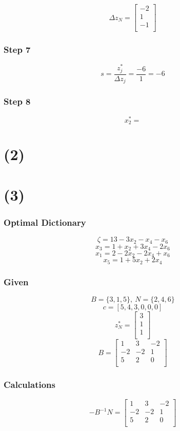 \documentclass[14pt]{extarticle}
\begin{document}
\[
    \Delta z_N =
    \begin{bmatrix}
        -2 \\
        1 \\
        -1 \\
    \end{bmatrix}
\]

\subsubsection*{Step 7}
\[
    s = \frac{z^*_j}{\Delta z_j} = \frac{-6}{1} = -6
\]

\subsubsection*{Step 8}
\[
    x^*_2 = 
\]

\section*{(2)}

\section*{(3)}
\subsubsection*{Optimal Dictionary}
\[
    \zeta = 13-3x_2-x_4-x_6
\]
\[
    x_3 = 1+x_2+3x_4-2x_6
\]
\[
    x_1 = 2-2x_2-2x_4+x_6
\]
\[
    x_5 = 1+5x_2+2x_4
\]

\subsubsection*{Given}
\[
    B = \{3, 1, 5\},\ N = \{2, 4, 6\}
\]
\[
    c = [5, 4, 3, 0, 0, 0]
\]
\[
    z^*_N = \begin{bmatrix}
        3 \\
        1 \\
        1 \\
    \end{bmatrix}
\]
\[
    B = \begin{bmatrix}
        1 & 3 & -2 \\
        -2 & -2 & 1 \\
        5 & 2 & 0 \\
    \end{bmatrix}
\]

\subsubsection*{Calculations}
\[
    -B^{-1}N = \begin{bmatrix}
        1 & 3 & -2 \\
        -2 & -2 & 1 \\
        5 & 2 & 0 \\
    \end{bmatrix}
\]
\end{document}
